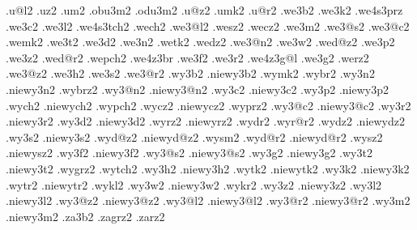 {  .u@l2                                             .uz2    
  .um2       .obu3m2     .odu3m2                    .u@z2   
  .umk2                                             .u@r2   
%
%
  .we3b2                        .we3k2                        .we4s3prz
  .we3c2                        .we3l2                        .we4s3tch2      
  .wech2                        .we3@l2                       .wesz2   
  .wecz2                        .we3m2                        .we3@s2  
  .we3@c2                       .wemk2                        .we3t2   
  .we3d2                        .we3n2                        .wetk2   
  .wedz2                        .we3@n2                       .we3w2   
  .wed@z2                       .we3p2                        .we3z2   
  .wed@r2                       .wepch2                       .we4z3br
  .we3f2                        .we3r2                        .we4z3g@l
  .we3g2                        .werz2                        .we3@z2  
  .we3h2                        .we3s2                        .we3@r2  
%
%
  .wy3b2      .niewy3b2                        .wymk2   
  .wybr2                                       .wy3n2      .niewy3n2     
  .wybrz2                                      .wy3@n2     .niewy3@n2    
  .wy3c2      .niewy3c2                        .wy3p2      .niewy3p2     
  .wych2      .niewych2                        .wypch2  
  .wycz2      .niewycz2                        .wyprz2
  .wy3@c2     .niewy3@c2                       .wy3r2      .niewy3r2     
  .wy3d2      .niewy3d2                        .wyrz2      .niewyrz2     
  .wydr2                                       .wyr@r2  
  .wydz2      .niewydz2                        .wy3s2      .niewy3s2     
  .wyd@z2     .niewyd@z2                       .wysm2   
  .wyd@r2     .niewyd@r2                       .wysz2      .niewysz2     
  .wy3f2      .niewy3f2                        .wy3@s2     .niewy3@s2    
  .wy3g2      .niewy3g2                        .wy3t2      .niewy3t2     
  .wygrz2                                      .wytch2     
  .wy3h2      .niewy3h2                        .wytk2      .niewytk2
  .wy3k2      .niewy3k2                        .wytr2      .niewytr2
  .wykl2                                       .wy3w2      .niewy3w2    
  .wykr2                                       .wy3z2      .niewy3z2
  .wy3l2      .niewy3l2                        .wy3@z2     .niewy3@z2
  .wy3@l2     .niewy3@l2                       .wy3@r2     .niewy3@r2
  .wy3m2      .niewy3m2     
%
%
  .za3b2                        .zagrz2                       .zarz2
}
